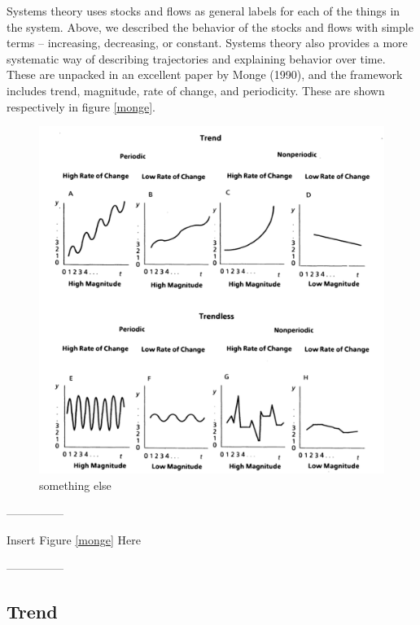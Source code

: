 \documentclass[]{article}
\begin{document}
Systems theory uses stocks and flows as general labels for each of the
things in the system. Above, we described the behavior of the stocks and
flows with simple terms -- increasing, decreasing, or constant. Systems
theory also provides a more systematic way of describing trajectories
and explaining behavior over time. These are unpacked in an excellent
paper by Monge (1990), and the framework includes trend, magnitude, rate
of change, and periodicity. These are shown respectively in figure
\ref{monge}.

\begin{figure}
\includegraphics[width=14.25in]{figs/fig_monge1} \caption{something else\label{monge}}\label{fig:unnamed-chunk-2}
\end{figure}

\begin{center}

---------------

Insert Figure \ref{monge} Here

---------------

\end{center}

\hypertarget{trend}{%
\subsection{Trend}\label{trend}}
\end{document}
